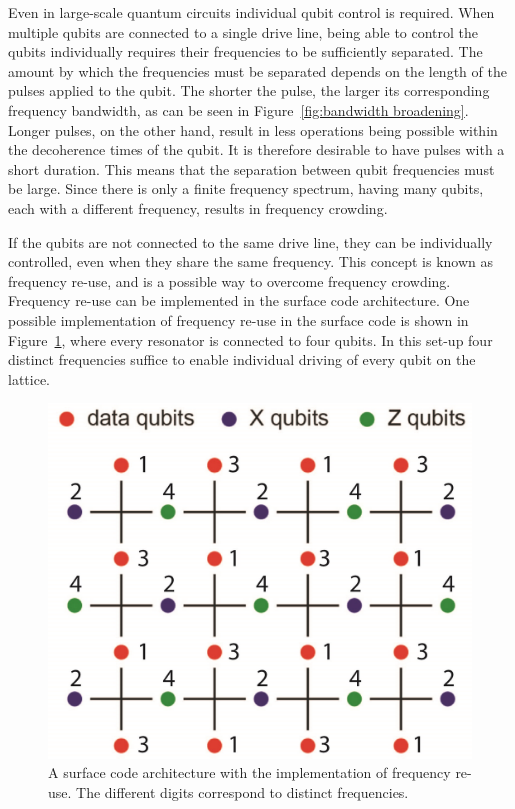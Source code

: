       Even in large-scale quantum circuits individual qubit control is required. When multiple qubits are connected to a single drive line, being able to control the qubits individually requires their frequencies to be sufficiently separated. The amount by which the frequencies must be separated depends on the length of the pulses applied to the qubit. The shorter the pulse, the larger its corresponding frequency bandwidth, as can be seen in Figure~\ref{fig:bandwidth broadening}. Longer pulses, on the other hand, result in less operations being possible within the decoherence times of the qubit. It is therefore desirable to have pulses with a short duration. This means that the separation between qubit frequencies must be large. Since there is only a finite frequency spectrum, having many qubits, each with a different frequency, results in frequency crowding.

      If the qubits are not connected to the same drive line, they can be individually controlled, even when they share the same frequency. This concept is known as frequency re-use, and is a possible way to overcome frequency crowding. Frequency re-use can be implemented in the surface code architecture. One possible implementation of frequency re-use in the surface code is shown in Figure~\ref{fig:surface code frequency re-use}, where every resonator is connected to four qubits. In this set-up four distinct frequencies suffice to enable individual driving of every qubit on the lattice.

      \begin{figure}[h]
        \centering
        \includegraphics[width=.6\textwidth]{../Figures/Exploring frequency re-use/surface_code_frequency re-use_cut.jpg}
        \caption{A surface code architecture with the implementation of frequency re-use. The different digits correspond to distinct frequencies. }
        \label{fig:surface code frequency re-use}
      \end{figure}

